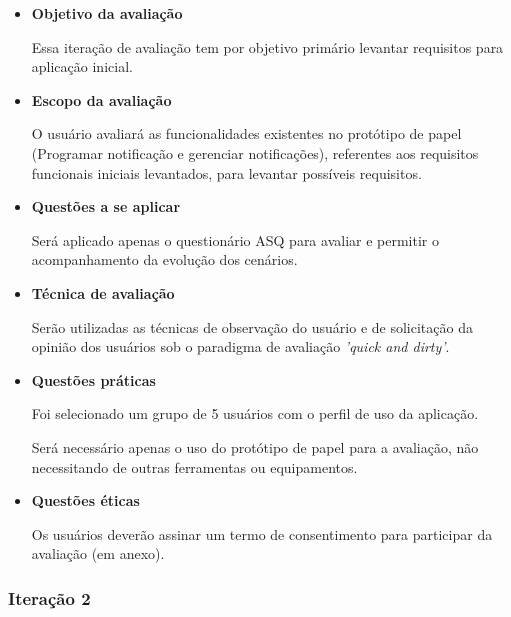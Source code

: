 	  \begin{itemize}
	   \item \textbf{Objetivo da avaliação}
	      
	      \subitem Essa iteração de avaliação tem por objetivo primário levantar requisitos para aplicação inicial.
	    
	   \item \textbf{Escopo da avaliação}
	      
	      \subitem 
		O usuário avaliará as funcionalidades existentes no protótipo de papel 
		(Programar notificação e gerenciar notificações), referentes aos requisitos funcionais iniciais levantados,
		para levantar possíveis requisitos.
	      
	   \item \textbf{Questões a se aplicar}
	      
	      \subitem Será aplicado apenas o questionário ASQ para avaliar e permitir o acompanhamento da evolução dos cenários.
	      
	   \item \textbf{Técnica de avaliação}
	      
	      \subitem 
		Serão utilizadas as técnicas de observação do usuário e de solicitação da opinião dos usuários
		sob o paradigma de avaliação \textit{'quick and dirty'}.
	      
	   \item \textbf{Questões práticas}
	      
	      \subitem Foi selecionado um grupo de 5 usuários com o perfil de uso da aplicação.
	      
	      \subitem Será necessário apenas o uso do protótipo de papel para a avaliação, não
		necessitando de outras ferramentas ou equipamentos.
	      
	   \item \textbf{Questões éticas}
	      
	      \subitem 
		Os usuários deverão assinar um termo de consentimento para participar da avaliação (em anexo).
	      
	  \end{itemize}
	
	\subsubsection{Iteração 2}
	  
